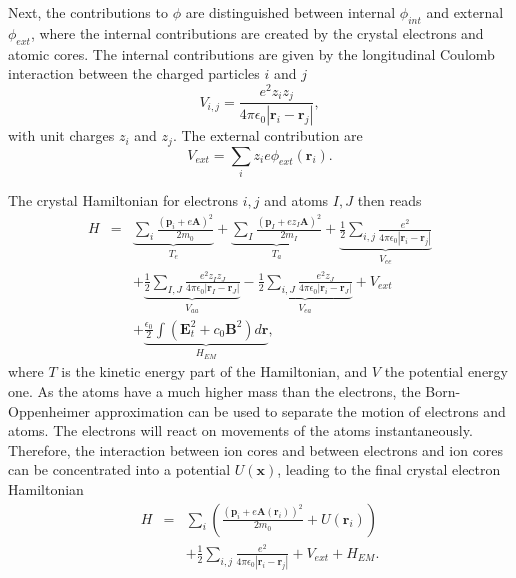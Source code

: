 Next, the contributions to $\phi$ are distinguished between internal
$\phi_{int}$ and external $\phi_{ext}$, where the internal contributions
are created by the crystal electrons and atomic cores. The internal
contributions are given by the longitudinal Coulomb interaction between
the charged particles $i$ and $j$\begin{equation}
V_{i,j}=\frac{e^{2}z_{i}z_{j}}{4\pi\epsilon_{0}|\mathbf{r}_{i}-\mathbf{r}_{j}|},\end{equation}
with unit charges $z_{i}$ and $z_{j}$. The external contribution
are \begin{equation}
V_{ext}=\sum_{i}z_{i}e\phi_{ext}(\mathbf{r}_{i}).\end{equation}


The crystal Hamiltonian for electrons $i,j$ and atoms $I,J$ then
reads\begin{eqnarray}
H & = & \underbrace{\sum_{i}\frac{\left(\mathbf{p}_{i}+e\mathbf{A}\right)^{2}}{2m_{0}}}_{T_{e}}+\underbrace{\sum_{I}\frac{\left(\mathbf{p}_{I}+ez_{I}\mathbf{A}\right)^{2}}{2m_{I}}}_{T_{a}}+\underbrace{\frac{1}{2}\sum_{i,j}\frac{e^{2}}{4\pi\epsilon_{0}|\mathbf{r}_{i}-\mathbf{r}_{j}|}}_{V_{ee}}\nonumber \\
 &  & +\underbrace{\frac{1}{2}\sum_{I,J}\frac{e^{2}z_{I}z_{J}}{4\pi\epsilon_{0}|\mathbf{r}_{I}-\mathbf{r}_{J}|}}_{V_{aa}}-\underbrace{\frac{1}{2}\sum_{i,J}\frac{e^{2}z_{J}}{4\pi\epsilon_{0}|\mathbf{r}_{i}-\mathbf{r}_{J}|}}_{V_{ea}}+V_{ext}\nonumber \\
 &  & +\underbrace{\frac{\epsilon_{0}}{2}\int\left(\mathbf{E}_{t}^{2}+c_{0}\mathbf{B}^{2}\right)d\mathbf{r}}_{H_{EM}},\end{eqnarray}
where $T$ is the kinetic energy part of the Hamiltonian, and $V$
the potential energy one. As the atoms have a much higher mass than
the electrons, the Born-Oppenheimer approximation \citet{Yu2005}
can be used to separate the motion of electrons and atoms. The electrons
will react on movements of the atoms instantaneously. Therefore, the
interaction between ion cores and between electrons and ion cores
can be concentrated into a potential $U(\mathbf{x})$, leading to
the final crystal electron Hamiltonian\begin{eqnarray}
H & = & \sum_{i}\left(\frac{\left(\mathbf{p}_{i}+e\mathbf{A}(\mathbf{r}_{i})\right)^{2}}{2m_{0}}+U(\mathbf{r}_{i})\right)\nonumber \\
 &  & +\frac{1}{2}\sum_{i,j}\frac{e^{2}}{4\pi\epsilon_{0}|\mathbf{r}_{i}-\mathbf{r}_{j}|}+V_{ext}+H_{EM}.\label{eq:crystal_H_final}\end{eqnarray}


